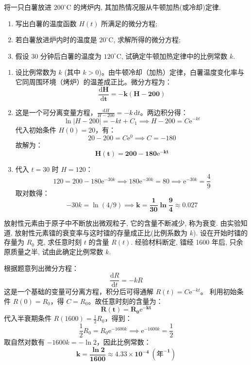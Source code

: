\documentclass[lang=cn,11pt]{elegantbook}
\begin{document}
\begin{exercise}[实际应用题]
将一只白薯放进 $200^\circ\mathrm{C}$ 的烤炉内, 其加热情况服从牛顿加热(或冷却)定律.
\begin{enumerate}
    \item[(1)] 写出白薯的温度函数 $H(t)$ 所满足的微分方程;
    \item[(2)] 若白薯放进炉内时的温度是 $20^\circ\mathrm{C}$, 求解所得的微分方程;
    \item[(3)] 假设 30 分钟后白薯的温度为 $120^\circ\mathrm{C}$, 试确定牛顿加热定律中的比例常数 $k$.
\end{enumerate}
\end{exercise}
\begin{solution}
\begin{enumerate}
    \item[(1)] 设比例常数为 $k$ (其中 $k>0$)。由牛顿冷却（加热）定律，白薯温度变化率与它同周围环境（烤炉）的温差成正比。微分方程为：
    \[
    \mathbf{\frac{\mathrm{d}H}{\mathrm{d}t} = -k(H - 200)}
    \]
    
    \item[(2)] 这是一个可分离变量方程，$\frac{\mathrm{d}H}{H-200} = -k\,\mathrm{d}t$。两边积分得：
    \[
    \ln|H-200| = -kt + C_1 \implies H-200 = C\mathrm{e}^{-kt}
    \]
    代入初始条件 $H(0) = 20$，有：
    \[
    20 - 200 = C\mathrm{e}^0 \implies C = -180
    \]
    故解为：
    \[
    \mathbf{H(t) = 200 - 180\mathrm{e}^{-kt}}
    \]
    
    \item[(3)] 代入 $t=30$ 时 $H=120$：
    \[
    120 = 200 - 180\mathrm{e}^{-30k} \implies 180\mathrm{e}^{-30k} = 80 \implies \mathrm{e}^{-30k} = \frac{4}{9}
    \]
    取对数得：
    \[
    -30k = \ln(4/9) \implies \mathbf{k = \frac{1}{30}\ln\frac{9}{4} \approx 0.027}
    \]
\end{enumerate}
\end{solution}

\begin{exercise}[实际应用题]
放射性元素由于原子中不断放出微观粒子, 它的含量不断减少, 称为衰变. 由实验知道, 放射性元素镭的衰变率与这时镭的存量成正比(比例系数为 $k$). 设在开始时镭的存量为 $R_0$ 克, 求任意时刻 $t$ 的含量 $R(t)$. 经验材料断定, 镭经 1600 年后, 只余原质量之半, 试由此确定比例常数 $k$.
\end{exercise}
\begin{solution}
根据题意列出微分方程：
\[
\frac{\mathrm{d}R}{\mathrm{d}t} = -kR
\]
这是一个基础的变量可分离方程，积分后可得通解 $R(t) = C\mathrm{e}^{-kt}$。
利用初始条件 $R(0) = R_0$，得 $C = R_0$。故任意时刻的含量为：
\[
\mathbf{R(t) = R_0\mathrm{e}^{-kt}}
\]
代入半衰期条件 $R(1600) = \frac{1}{2}R_0$，得到：
\[
\frac{1}{2}R_0 = R_0\mathrm{e}^{-1600k} \implies \mathrm{e}^{-1600k} = \frac{1}{2}
\]
取自然对数有 $-1600k = -\ln 2$，因此比例常数：
\[
\mathbf{k = \frac{\ln 2}{1600} \approx 4.33\times 10^{-4}\ (\text{年}^{-1})}
\]
\end{solution}
\end{document}
